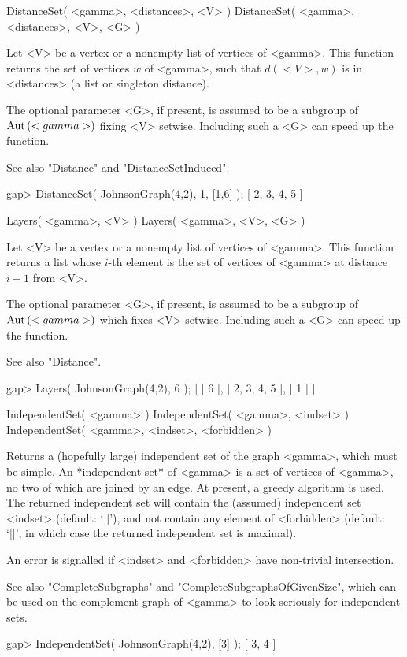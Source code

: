 
\>DistanceSet( <gamma>, <distances>, <V> )
\>DistanceSet( <gamma>, <distances>, <V>, <G> )

Let <V> be a vertex or a nonempty list of vertices of <gamma>.
This function returns the set of vertices $w$ of <gamma>, such that
$d(<V>,w)$ is in <distances> (a list or singleton distance).

The optional  parameter <G>, if  present, is assumed to be  a subgroup of
${\rm Aut}\,(<gamma>)$  fixing <V> setwise.  Including  such a <G> can speed  up
the function.

See also "Distance" and "DistanceSetInduced".

\beginexample
gap> DistanceSet( JohnsonGraph(4,2), 1, [1,6] );
[ 2, 3, 4, 5 ] 
\endexample


\>Layers( <gamma>, <V> )
\>Layers( <gamma>, <V>, <G> )


Let <V> be a vertex or a nonempty list of vertices of <gamma>.  This
function returns a list whose $i$-th element is the set of vertices of
<gamma> at distance $i-1$ from <V>.

The optional  parameter  <G>, if present, is assumed to  be a subgroup of
${\rm Aut}\,(<gamma>)$ which fixes <V>  setwise.  Including such a <G> can speed
up the function.

See also "Distance".

\beginexample
gap> Layers( JohnsonGraph(4,2), 6 );
[ [ 6 ], [ 2, 3, 4, 5 ], [ 1 ] ] 
\endexample


\>IndependentSet( <gamma> )
\>IndependentSet( <gamma>, <indset> )
\>IndependentSet( <gamma>, <indset>, <forbidden> )

Returns a (hopefully large) independent set of the graph <gamma>, which
must be simple.  An *independent set* of <gamma> is a set of vertices
of <gamma>, no two of which are joined by an edge.  At present, a
greedy algorithm is used.  The returned independent set will contain
the (assumed) independent set <indset> (default: `[]'), and not contain
any element of <forbidden> (default: `[]', in which case the returned
independent set is maximal).

An error is signalled if <indset> and <forbidden> have non-trivial
intersection.

See also "CompleteSubgraphs" and "CompleteSubgraphsOfGivenSize", which
can be used on the complement graph of <gamma> to look seriously for
independent sets.

\beginexample
gap> IndependentSet( JohnsonGraph(4,2), [3] );
[ 3, 4 ] 
\endexample
